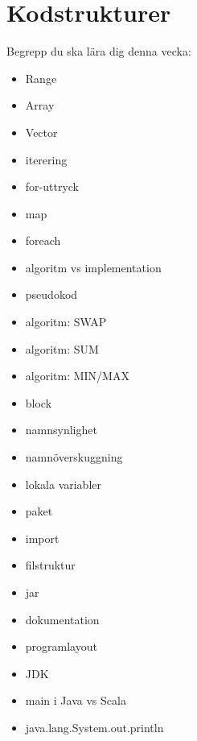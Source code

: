 \chapter{Kodstrukturer}\label{chapter:W02}
Begrepp du ska lära dig denna vecka:
\begin{itemize}[noitemsep,label={$\square$},leftmargin=*]
\item Range
\item Array
\item Vector
\item iterering
\item for-uttryck
\item map
\item foreach
\item algoritm vs implementation
\item pseudokod
\item algoritm: SWAP
\item algoritm: SUM
\item algoritm: MIN/MAX
\item block
\item namnsynlighet
\item namnöverskuggning
\item lokala variabler
\item paket
\item import
\item filstruktur
\item jar
\item dokumentation
\item programlayout
\item JDK
\item main i Java vs Scala
\item java.lang.System.out.println\end{itemize}
